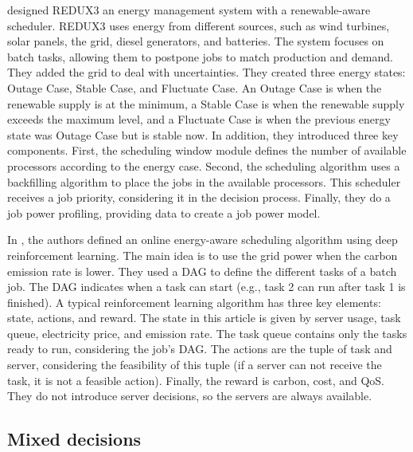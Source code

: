 \citeauthor{peng2022energy} designed REDUX3 an energy management system with a renewable-aware scheduler. REDUX3 uses energy from different sources, such as wind turbines, solar panels, the grid, diesel generators, and batteries. The system focuses on batch tasks, allowing them to postpone jobs to match production and demand. They added the grid to deal with uncertainties. They created three energy states: Outage Case, Stable Case, and Fluctuate Case. An Outage Case is when the renewable supply is at the minimum, a Stable Case is when the renewable supply exceeds the maximum level, and a Fluctuate Case is when the previous energy state was Outage Case but is stable now. In addition, they introduced three key components. First, the scheduling window module defines the number of available processors according to the energy case. Second, the scheduling algorithm uses a backfilling algorithm to place the jobs in the available processors. This scheduler receives a job priority, considering it in the decision process. Finally, they do a job power profiling, providing data to create a job power model.

In \cite{liu2023online}, the authors defined an online energy-aware scheduling algorithm using deep reinforcement learning. The main idea is to use the grid power when the carbon emission rate is lower. They used a DAG to define the different tasks of a batch job. The DAG indicates when a task can start (e.g., task 2 can run after task 1 is finished). A typical reinforcement learning algorithm has three key elements: state, actions, and reward. The state in this article is given by server usage, task queue, electricity price, and emission rate. The task queue contains only the tasks ready to run, considering the job's DAG. The actions are the tuple of task and server, considering the feasibility of this tuple (if a server can not receive the task, it is not a feasible action). Finally, the reward is carbon, cost, and QoS. They do not introduce server decisions, so the servers are always available.

\subsection{Mixed decisions}

